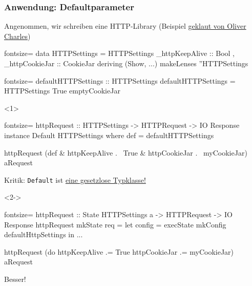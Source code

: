 \documentclass{beamer}
\begin{document}
\begin{frame}[fragile,t]
  \frametitle{Anwendung: Defaultparameter}
  Angenommen, wir schreiben eine HTTP-Library
  {\tiny (Beispiel \href{https://ocharles.org.uk/blog/posts/2015-07-23-another-approach-to-default-variables.html}{geklaut von Oliver Charles})}
  \begin{haskellcode*}{fontsize=\small}
data HTTPSettings = HTTPSettings
  { _httpKeepAlive :: Bool
  , _httpCookieJar :: CookieJar
  } deriving (Show, ...)
makeLenses ''HTTPSettings
  \end{haskellcode*}

  \begin{haskellcode*}{fontsize=\small}
defaultHTTPSettings :: HTTPSettings
defaultHTTPSettings = HTTPSettings True emptyCookieJar
  \end{haskellcode*}
  \begin{onlyenv}<1>
    \begin{haskellcode*}{fontsize=\small}
httpRequest :: HTTPSettings -> HTTPRequest -> IO Response
instance Default HTTPSettings where
  def = defaultHTTPSettings

httpRequest
  (def & httpKeepAlive .~ True
       & httpCookieJar .~ myCookieJar)
  aRequest
    \end{haskellcode*}
    Kritik: \verb|Default| ist \href{http://phaazon.blogspot.fr/2015/07/dont-use-default.html}{eine gesetzlose Typklasse!}
  \end{onlyenv}
  \begin{onlyenv}<2->
    \begin{haskellcode*}{fontsize=\small}
httpRequest :: State HTTPSettings a -> HTTPRequest -> IO Response
httpRequest mkState req =
  let config = execState mkConfig defaultHttpSettings in ...

httpRequest
  (do httpKeepAlive .= True
      httpCookieJar .= myCookieJar)
  aRequest
    \end{haskellcode*}
    Besser!
  \end{onlyenv}
\end{frame}
\end{document}

